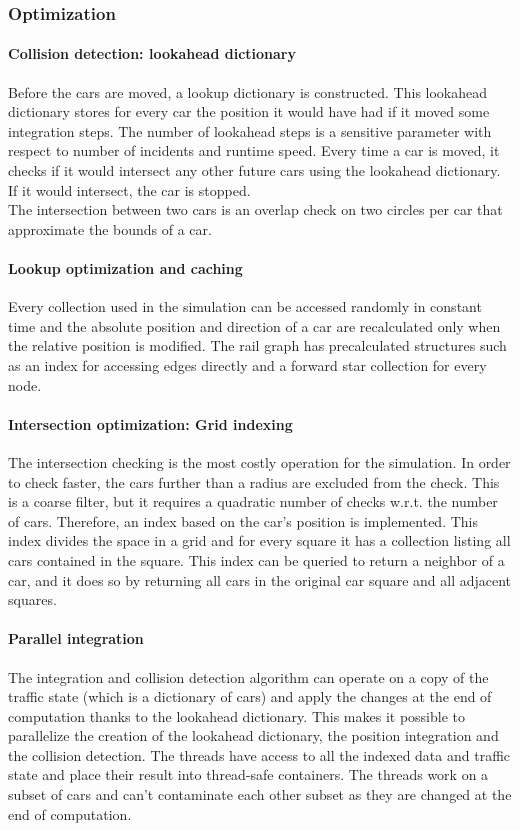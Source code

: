 \documentclass[12pt]{article}
\begin{document}
\subsubsection{Optimization}
\paragraph{Collision detection: lookahead dictionary}
Before the cars are moved, a lookup dictionary is constructed. This lookahead dictionary stores for every car the position it would have had if it moved some integration steps. The number of lookahead steps is a sensitive parameter with respect to number of incidents and runtime speed. Every time a car is moved, it checks if it would intersect any other future cars using the lookahead dictionary. If it would intersect, the car is stopped. \\
The intersection between two cars is an overlap check on two circles per car that approximate the bounds of a car.

\paragraph{Lookup optimization and caching}
Every collection used in the simulation can be accessed randomly in constant time and the absolute position and direction of a car are recalculated only when the relative position is modified. The rail graph has precalculated structures such as an index for accessing edges directly and a forward star collection for every node.

\paragraph{Intersection optimization: Grid indexing}
The intersection checking is the most costly operation for the simulation. In order to check faster, the cars further than a radius are excluded from the check. This is a coarse filter, but it requires a quadratic number of checks w.r.t. the number of cars. Therefore, an index based on the car's position is implemented. This index divides the space in a grid and for every square it has a collection listing all cars contained in the square. This index can be queried to return a neighbor of a car, and it does so by returning all cars in the original car square and all adjacent squares. 

\paragraph{Parallel integration}
The integration and collision detection algorithm can operate on a copy of the traffic state (which is a dictionary of cars) and apply the changes at the end of computation thanks to the lookahead dictionary. This makes it possible to parallelize the creation of the lookahead dictionary, the position integration and the collision detection. The threads have access to all the indexed data and traffic state and place their result into thread-safe containers. The threads work on a subset of cars and can't contaminate each other subset as they are changed at the end of computation.
\end{document}
